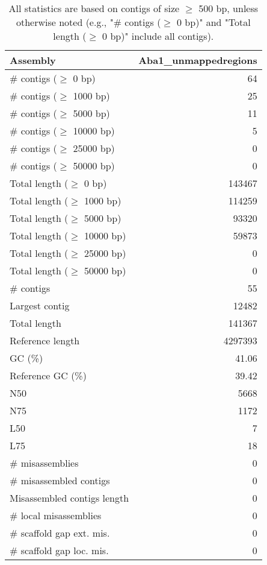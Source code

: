 \documentclass[12pt,a4paper]{article}
\begin{document}
\begin{table}[ht]
\begin{center}
\caption{All statistics are based on contigs of size $\geq$ 500 bp, unless otherwise noted (e.g., "\# contigs ($\geq$ 0 bp)" and "Total length ($\geq$ 0 bp)" include all contigs).}
\begin{tabular}{|l*{1}{|r}|}
\hline
Assembly & Aba1\_unmappedregions \\ \hline
\# contigs ($\geq$ 0 bp) & 64 \\ \hline
\# contigs ($\geq$ 1000 bp) & 25 \\ \hline
\# contigs ($\geq$ 5000 bp) & 11 \\ \hline
\# contigs ($\geq$ 10000 bp) & 5 \\ \hline
\# contigs ($\geq$ 25000 bp) & 0 \\ \hline
\# contigs ($\geq$ 50000 bp) & 0 \\ \hline
Total length ($\geq$ 0 bp) & 143467 \\ \hline
Total length ($\geq$ 1000 bp) & 114259 \\ \hline
Total length ($\geq$ 5000 bp) & 93320 \\ \hline
Total length ($\geq$ 10000 bp) & 59873 \\ \hline
Total length ($\geq$ 25000 bp) & 0 \\ \hline
Total length ($\geq$ 50000 bp) & 0 \\ \hline
\# contigs & 55 \\ \hline
Largest contig & 12482 \\ \hline
Total length & 141367 \\ \hline
Reference length & 4297393 \\ \hline
GC (\%) & 41.06 \\ \hline
Reference GC (\%) & 39.42 \\ \hline
N50 & 5668 \\ \hline
N75 & 1172 \\ \hline
L50 & 7 \\ \hline
L75 & 18 \\ \hline
\# misassemblies & 0 \\ \hline
\# misassembled contigs & 0 \\ \hline
Misassembled contigs length & 0 \\ \hline
\# local misassemblies & 0 \\ \hline
\# scaffold gap ext. mis. & 0 \\ \hline
\# scaffold gap loc. mis. & 0 \\ \hline

\end{tabular}
\end{center}
\end{table}
\end{document}
